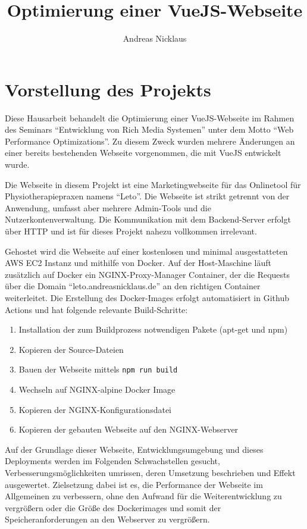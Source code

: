 \documentclass[11pt,a4paper]{article}
\title{Optimierung einer VueJS-Webseite}
\author{Andreas Nicklaus}
\begin{document}
\maketitle

\tableofcontents

\section{Vorstellung des Projekts}
Diese Hausarbeit behandelt die Optimierung einer VueJS-Webseite im Rahmen des Seminars \enquote{Entwicklung von Rich Media Systemen} unter dem Motto \enquote{Web Performance Optimizations}.
Zu diesem Zweck wurden mehrere Änderungen an einer bereits bestehenden Webseite vorgenommen, die mit VueJS entwickelt wurde.

Die Webseite in diesem Projekt ist eine Marketingwebseite für das Onlinetool für Physiotherapiepraxen namens \enquote{Leto}.
Die Webseite ist strikt getrennt von der Anwendung, umfasst aber mehrere Admin-Tools und die Nutzerkontenverwaltung.
Die Kommunikation mit dem Backend-Server erfolgt über HTTP und ist für dieses Projekt nahezu vollkommen irrelevant.

Gehostet wird die Webseite auf einer kostenlosen und minimal ausgestatteten AWS EC2 Instanz und mithilfe von Docker.
Auf der Host-Maschine läuft zusätzlich auf Docker ein NGINX-Proxy-Manager Container, der die Requests über die Domain \enquote{leto.andreasnicklaus.de} an den richtigen Container weiterleitet.
Die Erstellung des Docker-Images erfolgt automatisiert in Github Actions und hat folgende relevante Build-Schritte:

\begin{enumerate}
  \item Installation der zum Buildprozess notwendigen Pakete (apt-get und npm)
  \item Kopieren der Source-Dateien
  \item Bauen der Webseite mittels \verb|npm run build|
  \item Wechseln auf NGINX-alpine Docker Image
  \item Kopieren der NGINX-Konfigurationsdatei
  \item Kopieren der gebauten Webseite auf den NGINX-Webserver
\end{enumerate}

Auf der Grundlage dieser Webseite, Entwicklungsumgebung und dieses Deployments werden im Folgenden Schwachstellen gesucht, Verbesserungsmöglichkeiten umrissen, deren Umsetzung beschrieben und Effekt ausgewertet.
Zielsetzung dabei ist es, die Performance der Webseite im Allgemeinen zu verbessern, ohne den Aufwand für die Weiterentwicklung zu vergrößern oder die Größe des Dockerimages und somit der Speicheranforderungen an den Webserver zu vergrößern.
\end{document}
